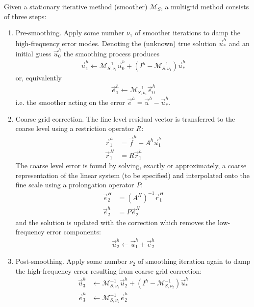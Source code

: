 Given a stationary iterative method (smoother) $\mathcal{M}_S$, a multigrid method consists of three steps:
\begin{enumerate}
    \item Pre-smoothing.   Apply some number $\nu_1$ of smoother iterations to damp the high-frequency error modes.   Denoting the (unknown) true solution $\vec{u}^h_*$ and an initial guess $\vec{u}^h_0$ the smoothing process produces
    \begin{align}
        \vec{u}^h_1 \leftarrow \mathcal{M}_{S,\nu_1}^{-1} \vec{u}^h_0 + (I^h - \mathcal{M}_{S,\nu_1}^{-1})\vec{u}^h_* \label{eq:mg_step_presmooth}
    \end{align}
    or, equivalently
    \begin{align}
        \vec{e}^h_1 \leftarrow \mathcal{M}_{S,\nu_1}^{-1} \vec{e}^h_0 \label{eq:mg_step_presmooth_error}
    \end{align}
    i.e. the smoother acting on the error $\vec{e}^h = \vec{u}^h - \vec{u}^h_*$.
    \item Coarse grid correction.    The fine level residual vector is transferred to the coarse level using a restriction operator $R$:
    \begin{align}
        \vec{r}^h_1 &= \vec{f}^h - A^h\vec{u}^h_1 \label{eq:mg_step_residual} \\
        \vec{r}^H_1 &= R \vec{r}^h_1 \label{eq:mg_step_restriction}
    \end{align}
    The coarse level error is found by solving, exactly or approximately, a coarse representation of the linear system (to be specified) and interpolated onto the fine scale using a prolongation operator $P$:
    \begin{align}
        \vec{e}^H_2 &= (A^H)^{-1} \vec{r}^H_1 \label{eq:mg_step_coarse}\\
        \vec{e}^h_2 &= P \vec{e}^H_2 \label{eq:mg_step_prolongation}
    \end{align}
    and the solution is updated with the correction which removes the low-frequency error components:
    \begin{align}
        \vec{u}^h_2 \leftarrow \vec{u}^h_1 + \vec{e}^h_2 \label{eq:mg_step_update}
    \end{align}
    \item Post-smoothing.   Apply some number $\nu_2$ of smoothing iteration again to damp the high-frequency error resulting from coarse grid correction:
    \begin{align}
        \vec{u}^h_3 &\leftarrow \mathcal{M}_{S,\nu_2}^{-1} \vec{u}^h_2 + (I^h - \mathcal{M}_{S,\nu_2}^{-1})\vec{u}^h_* \label{eq:mg_step_postsmooth}\\
        \vec{e}^h_3 &\leftarrow \mathcal{M}_{S,\nu_2}^{-1} \vec{e}^h_2 \label{eq:mg_step_postsmooth_error}
    \end{align}
\end{enumerate}

